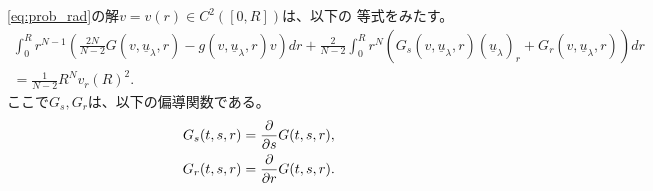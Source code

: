 \begin{lem}
 \eqref{eq:prob_rad}の解$v = v(r) \in C^2([0, R])$は、以下の
 等式をみたす。
 \begin{multline}
  \int_0^R r^{N-1} \left( \frac{2N}{N-2} G(v, \underline{u}_\lambda,
  r) - g(v, \underline{u}_\lambda, r) v \right) dr
  + \frac{2}{N-2} \int_0^R r^N \left( G_s(v, \underline{u}_\lambda, r)
  (\underline{u}_\lambda)_r + G_r(v, \underline{u}_\lambda, r)
  \right) dr \\ = \frac{1}{N-2} R^N v_r(R)^2. \label{eq:poh_eq}
 \end{multline}
 ここで$G_s, G_r$は、以下の偏導関数である。
 \begin{align*}
  G_s(t, s, r) &= \frac{\partial }{\partial s} G(t, s, r), \\
  G_r(t, s, r) &= \frac{\partial }{\partial r} G(t, s, r).
 \end{align*}
\end{lem}

